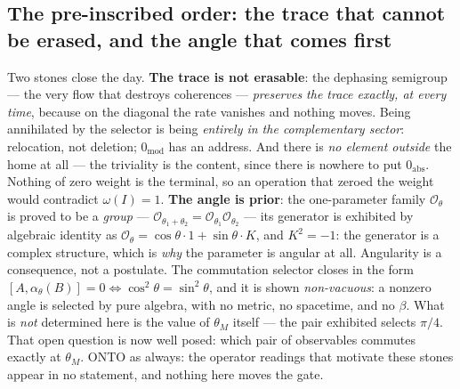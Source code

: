 \documentclass[11pt]{article}
\theoremstyle{definition}\newtheorem{deriv}{Derivation}
\begin{document}
\subsection*{The pre-inscribed order: the trace that cannot be erased, and the angle that comes first}Two stones close the day. \textbf{The trace is not erasable}: the dephasing semigroup --- the very flow that destroys coherences --- \emph{preserves the trace exactly, at every time}, because on the diagonal the rate vanishes and nothing moves. Being annihilated by the selector is being \emph{entirely in the complementary sector}: relocation, not deletion; $0_{\mathrm{mod}}$ has an address. And there is \emph{no element outside} the home at all --- the triviality is the content, since there is nowhere to put $0_{\mathrm{abs}}$. Nothing of zero weight is the terminal, so an operation that zeroed the weight would contradict $\omega(I)=1$. \textbf{The angle is prior}: the one-parameter family $\mathcal{O}_\theta$ is proved to be a \emph{group} --- $\mathcal{O}_{\theta_1+\theta_2} = \mathcal{O}_{\theta_1}\mathcal{O}_{\theta_2}$ --- its generator is exhibited by algebraic identity as $\mathcal{O}_\theta = \cos\theta\cdot 1 + \sin\theta\cdot K$, and $K^2 = -1$: the generator is a complex structure, which is \emph{why} the parameter is angular at all. Angularity is a consequence, not a postulate. The commutation selector closes in the form $[A,\alpha_\theta(B)]=0 \iff \cos^2\theta = \sin^2\theta$, and it is shown \emph{non-vacuous}: a nonzero angle is selected by pure algebra, with no metric, no spacetime, and no $\beta$. What is \emph{not} determined here is the value of $\theta_M$ itself --- the pair exhibited selects $\pi/4$. That open question is now well posed: which pair of observables commutes exactly at $\theta_M$. \textsf{ONTO} as always: the operator readings that motivate these stones appear in no statement, and nothing here moves the gate.
\end{document}
